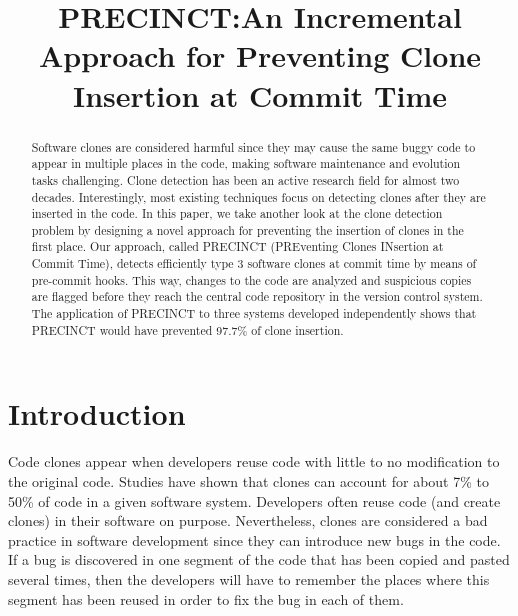 \documentclass[conference]{IEEEtran}
\begin{document}
\title{PRECINCT:\@ An Incremental Approach for Preventing Clone Insertion at Commit Time}


\author{
\and
{}
}

\maketitle

\begin{abstract}
Software clones are considered harmful since they may cause the same buggy code to appear in multiple places in the code, making software maintenance and evolution tasks challenging. Clone detection has been an active research field for almost two decades.
Interestingly, most existing techniques focus on detecting clones after they are inserted in the code.
In this paper, we take another look at the clone detection problem by designing a novel approach for preventing the insertion of clones in the first place. Our approach, called PRECINCT (PREventing Clones INsertion at Commit Time),  detects efficiently type 3 software clones at commit time by means of pre-commit hooks.
This way, changes to the code are analyzed and suspicious copies are flagged before they reach the central code repository in the version control system.  The application of PRECINCT to three systems developed independently shows that PRECINCT would have prevented 97.7\% of clone insertion.


\end{abstract}


\IEEEpeerreviewmaketitle

\section{Introduction}
\label{sec:Introduction}


Code clones appear when developers reuse code with little to no modification to the original code.
Studies have shown  that clones can account for about 7\% to 50\% of code in a given software system\cite{Baker, StephaneDucasse}.
Developers often reuse code (and create clones) in their software on purpose\cite{Kim2005}.
Nevertheless, clones are considered a bad practice in software development since they can introduce new bugs in the code\cite{Kapser2006,Juergens2009,Li2006}.
If a  bug is discovered in one segment of the code that has been copied and pasted several times, then the developers will have to remember the places where this segment has been reused in order to fix the bug in each of them.
\end{document}
